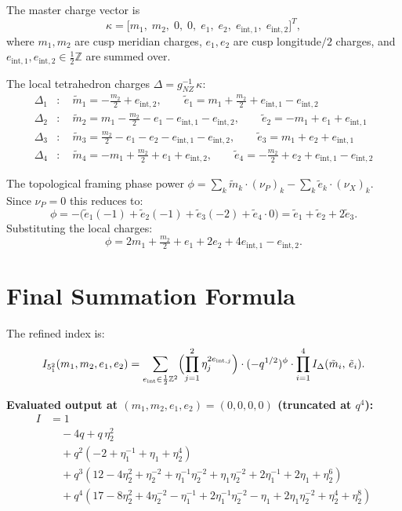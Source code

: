 \documentclass[12pt]{article}
\begin{document}
The master charge vector is
\[
\kappa = \bigl[m_1,\; m_2,\; 0,\; 0,\; e_1,\; e_2,\; e_{\mathrm{int},1},\; e_{\mathrm{int},2}\bigr]^T,
\]
where $m_1, m_2$ are cusp meridian charges, $e_1, e_2$ are cusp longitude$/2$ charges,
and $e_{\mathrm{int},1}, e_{\mathrm{int},2} \in \tfrac{1}{2}\mathbb{Z}$ are summed over.

The local tetrahedron charges $\Delta = g_{NZ}^{-1}\,\kappa$:
\begin{align*}
\Delta_1 &: \quad
  \tilde{m}_1 = -\tfrac{m_2}{2} + e_{\mathrm{int},2},
  \qquad
  \tilde{e}_1 = m_1 + \tfrac{m_2}{2} + e_{\mathrm{int},1} - e_{\mathrm{int},2} \\[4pt]
\Delta_2 &: \quad
  \tilde{m}_2 = m_1 - \tfrac{m_2}{2} - e_1 - e_{\mathrm{int},1} - e_{\mathrm{int},2},
  \qquad
  \tilde{e}_2 = -m_1 + e_1 + e_{\mathrm{int},1} \\[4pt]
\Delta_3 &: \quad
  \tilde{m}_3 = \tfrac{m_2}{2} - e_1 - e_2 - e_{\mathrm{int},1} - e_{\mathrm{int},2},
  \qquad
  \tilde{e}_3 = m_1 + e_2 + e_{\mathrm{int},1} \\[4pt]
\Delta_4 &: \quad
  \tilde{m}_4 = -m_1 + \tfrac{m_2}{2} + e_1 + e_{\mathrm{int},2},
  \qquad
  \tilde{e}_4 = -\tfrac{m_2}{2} + e_2 + e_{\mathrm{int},1} - e_{\mathrm{int},2}
\end{align*}

The topological framing phase power
$\phi = \sum_k \tilde{m}_k \cdot (\nu_P)_k - \sum_k \tilde{e}_k \cdot (\nu_X)_k$.
Since $\nu_P = 0$ this reduces to:
\[
\phi
= -\bigl(\tilde{e}_1(-1) + \tilde{e}_2(-1) + \tilde{e}_3(-2) + \tilde{e}_4 \cdot 0\bigr)
= \tilde{e}_1 + \tilde{e}_2 + 2\tilde{e}_3.
\]
Substituting the local charges:
\[
\phi = 2m_1 + \tfrac{m_2}{2} + e_1 + 2e_2 + 4e_{\mathrm{int},1} - e_{\mathrm{int},2}.
\]

\section{Final Summation Formula}
The refined index is:
\[
I_{5^2_1}(m_1, m_2, e_1, e_2)
= \sum_{e_{\mathrm{int}} \in \frac{1}{2}\mathbb{Z}^2}
   \Bigl(\prod_{j=1}^{2} \eta_j^{2e_{\mathrm{int},j}}\Bigr)
   \cdot (-q^{1/2})^{\phi}
   \cdot \prod_{i=1}^{4} I_{\Delta}(\tilde{m}_i,\, \tilde{e}_i).
\]

\textbf{Evaluated output at $(m_1, m_2, e_1, e_2) = (0,0,0,0)$ (truncated at $q^4$):}
\begin{align*}
I &= 1 \\
&\quad - 4q + q\,\eta_2^{2} \\
&\quad + q^2\!\left( -2 + \eta_1^{-1} + \eta_1 + \eta_2^{4} \right) \\
&\quad + q^3\!\left( 12 - 4\eta_2^{2} + \eta_2^{-2} + \eta_1^{-1}\eta_2^{-2} + \eta_1\eta_2^{-2}
                    + 2\eta_1^{-1} + 2\eta_1 + \eta_2^{6} \right) \\
&\quad + q^4\!\left( 17 - 8\eta_2^{2} + 4\eta_2^{-2} - \eta_1^{-1} + 2\eta_1^{-1}\eta_2^{-2}
                    - \eta_1 + 2\eta_1\eta_2^{-2} + \eta_2^{4} + \eta_2^{8} \right)
\end{align*}
\end{document}
